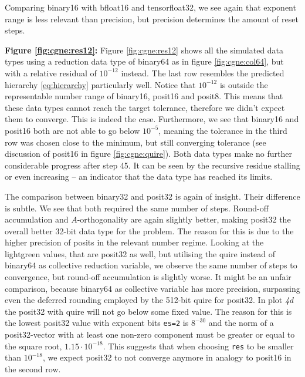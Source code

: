 \documentclass{article}
\theoremstyle{plain} %
\theoremstyle{convention} %
\theoremstyle{remark} %
\def\code#1{\texttt{#1}}
\numberwithin{equation}{section}
\begin{document}
Comparing \gls{binary16} with \gls{bfloat16} and \gls{tensorfloat32}, we see again that exponent range is less relevant than precision, but precision determines the amount of reset steps.

\textbf{Figure \ref{fig:cgne:res12}:} Figure \ref{fig:cgne:res12} shows all the simulated data types using a reduction data type of \gls{binary64} as in figure \ref{fig:cgne:col64}, but with a relative residual of $10^{-12}$ instead. The last row resembles the predicted hierarchy \eqref{eq:hierarchy} particularly well. Notice that $10^{-12}$ is outside the representable number range of \gls{binary16}, \gls{posit16} and \gls{posit8}. This means that these data types cannot reach the target tolerance, therefore we didn't expect them to converge. This is indeed the case. Furthermore, we see that \gls{binary16} and \gls{posit16} both are not able to go below $10^{-5}$, meaning the tolerance in the third row was chosen close to the minimum, but still converging tolerance (see discussion of \gls{posit16} in figure \ref{fig:cgne:quire}). Both data types make no further considerable progress after step \num{45}. It can be seen by the recursive residue stalling or even increasing -- an indicator that the data type has reached its limits.

The comparison between \gls{binary32} and \gls{posit32} is again of insight. Their difference is subtle. We see that both required the same number of steps. Round-off accumulation and $A$-orthogonality are again slightly better, making \gls{posit32} the overall better \num{32}-bit data type for the problem. The reason for this is due to the higher precision of posits in the relevant number regime. Looking at the \textcolor{clightgreen}{lightgreen} values, that are \gls{posit32} as well, but utilising the \gls{quire} instead of \gls{binary64} as collective reduction variable, we observe the same number of steps to convergence, but round-off accumulation is slightly worse. It might be an unfair comparison, because \gls{binary64} as collective variable has more precision, surpassing even the deferred rounding employed by the \num{512}-bit \gls{quire} for \gls{posit32}. In plot \textit{4d} the \gls{posit32} with \gls{quire} will not go below some fixed value. The reason for this is the lowest \gls{posit32} value with exponent bits \code{es=2} is $8^{-30}$ and the norm of a \gls{posit32}-vector with at least one non-zero component must be greater or equal to the square root, $1.15 \cdot 10^{-18}$. This suggests that when choosing \code{res} to be smaller than $10^{-18}$, we expect \gls{posit32} to not converge anymore in analogy to \gls{posit16} in the second row.
\end{document}
